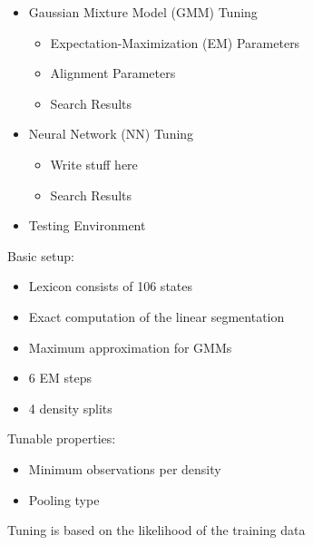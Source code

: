 \documentclass[11pt, a4paper, landscape]{article}
\begin{document}
\TitlePage

\NewPage{}
\vfill
\begin{itemize}
  \item Gaussian Mixture Model (GMM) Tuning
  \begin{itemize}
    \item Expectation-Maximization (EM) Parameters
    \item Alignment Parameters
    \item Search Results
  \end{itemize}
  \item Neural Network (NN) Tuning
  \begin{itemize}
    \item Write stuff here
    \item Search Results
  \end{itemize}
  \item Testing Environment
\end{itemize}
\vfill

\NewPage{}
\vfill
Basic setup:
\begin{itemize}
  \item Lexicon consists of 106 states
  \item Exact computation of the linear segmentation
  \item Maximum approximation for GMMs
  \item 6 EM steps
  \item 4 density splits
\end{itemize} 
\vspace{20pt}
Tunable properties:
\begin{itemize}
  \item Minimum observations per density
  \item Pooling type
\end{itemize}
\vspace{20pt}
Tuning is based on the likelihood of the training data
\vfill

 
\end{document}
